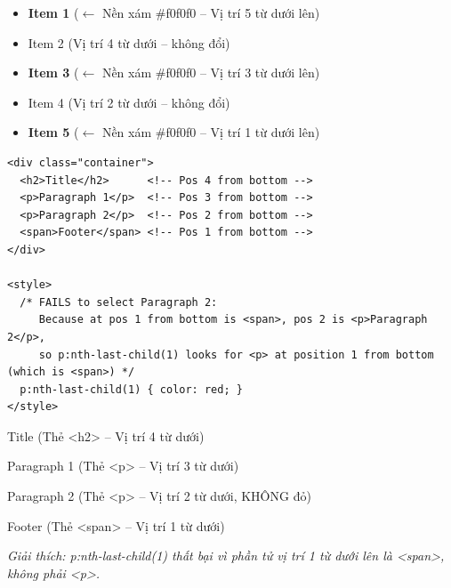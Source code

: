 \begin{browserWindow}
\sffamily\small
\begin{itemize}[leftmargin=1.5em, itemsep=3pt, parsep=0pt]
    \item \colorbox{gray!20}{\textbf{Item 1}} {\scriptsize\textcolor{gray!60}{($\leftarrow$ Nền xám \#f0f0f0 -- Vị trí 5 từ dưới lên)}}
    \item Item 2 {\scriptsize\textcolor{gray!60}{(Vị trí 4 từ dưới -- không đổi)}}
    \item \colorbox{gray!20}{\textbf{Item 3}} {\scriptsize\textcolor{gray!60}{($\leftarrow$ Nền xám \#f0f0f0 -- Vị trí 3 từ dưới lên)}}
    \item Item 4 {\scriptsize\textcolor{gray!60}{(Vị trí 2 từ dưới -- không đổi)}}
    \item \colorbox{gray!20}{\textbf{Item 5}} {\scriptsize\textcolor{gray!60}{($\leftarrow$ Nền xám \#f0f0f0 -- Vị trí 1 từ dưới lên)}}
\end{itemize}
\end{browserWindow}

\begin{codeWindow}
\begin{lstlisting}[language=HTML5]
<div class="container">
  <h2>Title</h2>      <!-- Pos 4 from bottom -->
  <p>Paragraph 1</p>  <!-- Pos 3 from bottom -->
  <p>Paragraph 2</p>  <!-- Pos 2 from bottom -->
  <span>Footer</span> <!-- Pos 1 from bottom -->
</div>

<style>
  /* FAILS to select Paragraph 2:
     Because at pos 1 from bottom is <span>, pos 2 is <p>Paragraph 2</p>,
     so p:nth-last-child(1) looks for <p> at position 1 from bottom (which is <span>) */
  p:nth-last-child(1) { color: red; }
</style>
\end{lstlisting}
\end{codeWindow}

\begin{browserWindow}
\sffamily\small
Title {\scriptsize\textcolor{gray!60}{(Thẻ <h2> -- Vị trí 4 từ dưới)}} \par\vspace{2pt}
Paragraph 1 {\scriptsize\textcolor{gray!60}{(Thẻ <p> -- Vị trí 3 từ dưới)}} \par\vspace{2pt}
Paragraph 2 {\scriptsize\textcolor{gray!60}{(Thẻ <p> -- Vị trí 2 từ dưới, KHÔNG đỏ)}} \par\vspace{2pt}
Footer {\scriptsize\textcolor{gray!60}{(Thẻ <span> -- Vị trí 1 từ dưới)}} \par\vspace{4pt}
{\scriptsize\textcolor{gray!60}{\textit{Giải thích: p:nth-last-child(1) thất bại vì phần tử vị trí 1 từ dưới lên là <span>, không phải <p>.}}}
\end{browserWindow}

